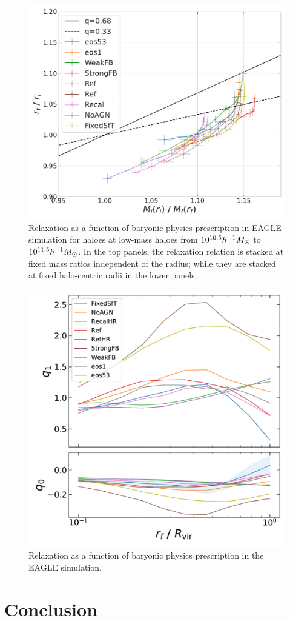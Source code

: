 \begin{figure}[htbp]
\includegraphics[width=0.32\linewidth]{plots/eagle_physvar_rad_indep_relxn_reln_rf_11.5.pdf}
\caption[]{Relaxation as a function of baryonic physics prescription in EAGLE simulation for haloes at low-mass haloes from $10^{10.5} h^{-1}M_{\odot}$ to $10^{11.5} h^{-1}M_{\odot}$. In the top panels, the relaxation relation is stacked at fixed mass ratios independent of the radius; while they are stacked at fixed halo-centric radii in the lower panels.}
\label{fig:EAGLE-rad-indep}
\end{figure}

\begin{figure}[htbp]
\centering
\includegraphics[width=0.7\linewidth]{plots/fit_params_rf_M_E_physvar_fatmass_uniradb.pdf}
\caption[]{Relaxation as a function of baryonic physics prescription in the EAGLE simulation.}
\end{figure}


\section{Conclusion}
\label{sec:conclusion}


